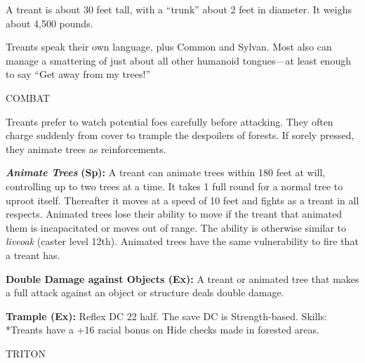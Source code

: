 \documentclass{article}
\begin{document}
A treant is about 30 feet tall, with a ``trunk'' about 2 feet in diameter. It weighs 
about 4,500 pounds.

Treants speak their own language, plus Common and Sylvan. Most also can manage 
a smattering of just about all other humanoid tongues---at least enough to say 
``Get away from my trees!''

COMBAT

Treants prefer to watch potential foes carefully before attacking. They often charge 
suddenly from cover to trample the despoilers of forests. If sorely pressed, they 
animate trees as reinforcements.

\textit{\textbf{Animate Trees }}\textbf{(Sp): }A treant can animate trees within 
180 feet at will, controlling up to two trees at a time. It takes 1 full round 
for a normal tree to uproot itself. Thereafter it moves at a speed of 10 feet and 
fights as a treant in all respects. Animated trees lose their ability to move if 
the treant that animated them is incapacitated or moves out of range. The ability 
is otherwise similar to \textit{liveoak }(caster level 12th). Animated trees have 
the same vulnerability to fire that a treant has.

\textbf{Double Damage against Objects (Ex): }A treant or animated tree that makes 
a full attack against an object or structure deals double damage.

\textbf{Trample (Ex):} Reflex DC 22 half. The save DC is Strength-based. Skills: 
*Treants have a +16 racial bonus on Hide checks made in forested areas.

\vspace{12pt}
{\LARGE{}TRITON}
\end{document}
